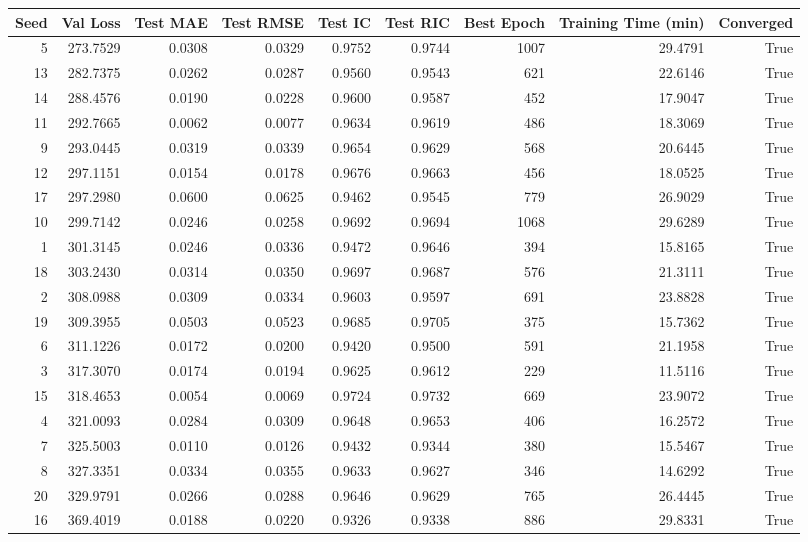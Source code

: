 \begin{tabular}{rrrrrrrrr}
\toprule
Seed & Val Loss & Test MAE & Test RMSE & Test IC & Test RIC & Best Epoch & Training Time (min) & Converged \\
\midrule
5 & 273.7529 & 0.0308 & 0.0329 & 0.9752 & 0.9744 & 1007 & 29.4791 & True \\
13 & 282.7375 & 0.0262 & 0.0287 & 0.9560 & 0.9543 & 621 & 22.6146 & True \\
14 & 288.4576 & 0.0190 & 0.0228 & 0.9600 & 0.9587 & 452 & 17.9047 & True \\
11 & 292.7665 & 0.0062 & 0.0077 & 0.9634 & 0.9619 & 486 & 18.3069 & True \\
9 & 293.0445 & 0.0319 & 0.0339 & 0.9654 & 0.9629 & 568 & 20.6445 & True \\
12 & 297.1151 & 0.0154 & 0.0178 & 0.9676 & 0.9663 & 456 & 18.0525 & True \\
17 & 297.2980 & 0.0600 & 0.0625 & 0.9462 & 0.9545 & 779 & 26.9029 & True \\
10 & 299.7142 & 0.0246 & 0.0258 & 0.9692 & 0.9694 & 1068 & 29.6289 & True \\
1 & 301.3145 & 0.0246 & 0.0336 & 0.9472 & 0.9646 & 394 & 15.8165 & True \\
18 & 303.2430 & 0.0314 & 0.0350 & 0.9697 & 0.9687 & 576 & 21.3111 & True \\
2 & 308.0988 & 0.0309 & 0.0334 & 0.9603 & 0.9597 & 691 & 23.8828 & True \\
19 & 309.3955 & 0.0503 & 0.0523 & 0.9685 & 0.9705 & 375 & 15.7362 & True \\
6 & 311.1226 & 0.0172 & 0.0200 & 0.9420 & 0.9500 & 591 & 21.1958 & True \\
3 & 317.3070 & 0.0174 & 0.0194 & 0.9625 & 0.9612 & 229 & 11.5116 & True \\
15 & 318.4653 & 0.0054 & 0.0069 & 0.9724 & 0.9732 & 669 & 23.9072 & True \\
4 & 321.0093 & 0.0284 & 0.0309 & 0.9648 & 0.9653 & 406 & 16.2572 & True \\
7 & 325.5003 & 0.0110 & 0.0126 & 0.9432 & 0.9344 & 380 & 15.5467 & True \\
8 & 327.3351 & 0.0334 & 0.0355 & 0.9633 & 0.9627 & 346 & 14.6292 & True \\
20 & 329.9791 & 0.0266 & 0.0288 & 0.9646 & 0.9629 & 765 & 26.4445 & True \\
16 & 369.4019 & 0.0188 & 0.0220 & 0.9326 & 0.9338 & 886 & 29.8331 & True \\
\bottomrule
\end{tabular}
